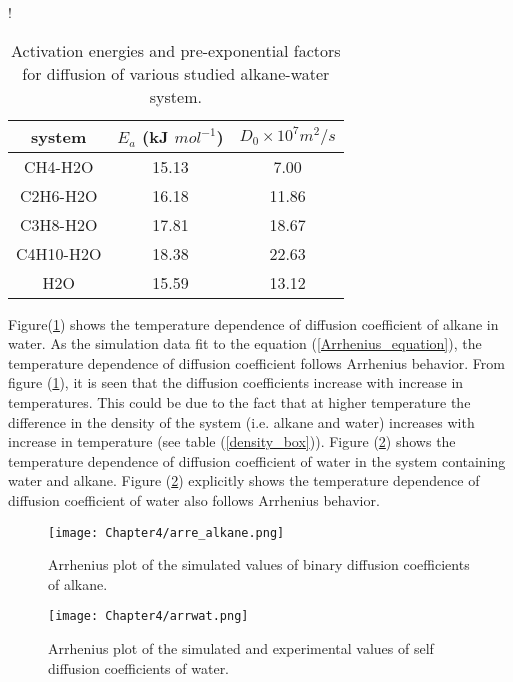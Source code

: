 \begin{table}[H]
\centering
 \caption[Activation energies and pre-exponential factors for diffusion of various studied alkane-water system.] {Activation energies and pre-exponential factors for diffusion of various studied alkane-water system.}
  \label{activation_energy}
\resizebox {0.65 \textwidth } {!}{%
\begin{tabular} {|c|  c| c| }  \hline
 system & $E_a$ (kJ $mol^{-1}$) & $D_0 \times 10^7 m^2/s $  \\ \hline
CH4-H2O & 15.13 &  7.00 \\ \hline 
C2H6-H2O & 16.18  & 11.86 \\ \hline  
C3H8-H2O & 17.81  & 18.67 \\  \hline
C4H10-H2O & 18.38  & 22.63 \\  \hline
H2O & 15.59  & 13.12 \\\hline
\end{tabular}} 
\end{table} 

 Figure(\ref{arrhenius_alkane})  shows the temperature dependence of diffusion coefficient of alkane in water. As the simulation  data fit to the equation (\ref{Arrhenius_equation}), the temperature dependence of diffusion coefficient follows Arrhenius  behavior. From figure (\ref{arrhenius_alkane}), it is seen that the diffusion coefficients increase with increase in temperatures. This could be due to the fact that at higher temperature the difference in the density of the system (i.e. alkane and water) increases with  increase in temperature (see table (\ref{density_box})).
\noindent Figure (\ref{arrhenius_water}) shows the temperature dependence of diffusion coefficient of water in the system containing water and alkane. Figure (\ref{arrhenius_water}) explicitly shows the temperature dependence of diffusion coefficient of water also follows Arrhenius behavior.

\begin{figure}[h!]
 \centering
\texttt{[image: Chapter4/arre\_alkane.png]}
\caption[Arrhenius plot of the simulated values of binary diffusion coefficients of alkane in water.] {Arrhenius plot of the simulated values of binary diffusion coefficients of alkane.}
\label{arrhenius_alkane}
\end{figure}

\begin{figure}[h!]
\centering
\texttt{[image: Chapter4/arrwat.png]}
\caption[Arrhenius plot of the simulated and experimental values of self diffusion coefficients of  water.] {Arrhenius plot of the simulated and experimental values of self diffusion coefficients of water.}
\label{arrhenius_water}
\end{figure}


